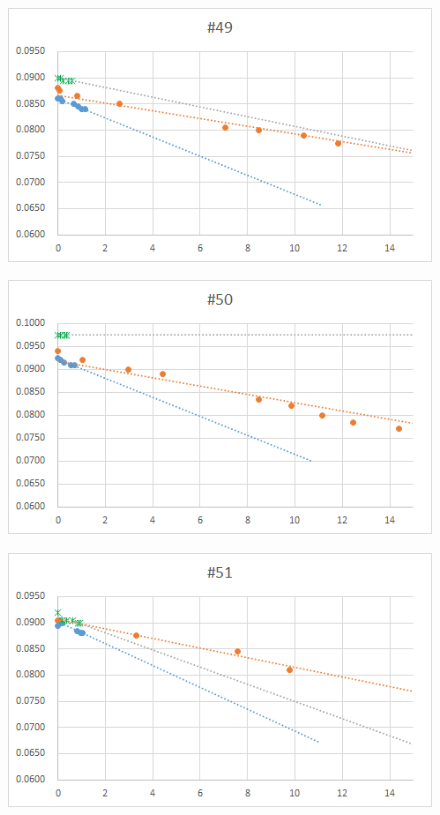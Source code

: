   \begin{figure}[htbp]
    \centering
       \includegraphics[width=120mm]{vol_049.png}
  \end{figure}
  \begin{figure}[htbp]
    \centering
       \includegraphics[width=120mm]{vol_050.png}
  \end{figure}
  \begin{figure}[htbp]
    \centering
       \includegraphics[width=120mm]{vol_051.png}
  \end{figure}
